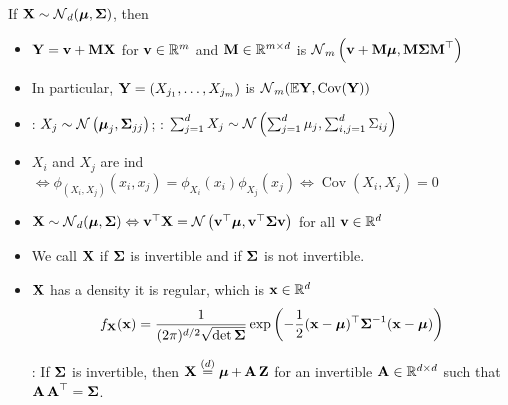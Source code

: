 If $\vect{X} \sim \N_{d}(\vect{\mu}, \vect{\Sigma})$, then
\begin{itemize}[leftmargin=*]
    \item $\vect{Y}=\vect{v}+\vect{MX}$ for $\vect{v} \in \mathbb{R}^{m}$ and $\vect{M} \in \mathbb{R}^{m \times d}$ is $\N_{m}\left(\vect{v}+\vect{M \mu}, \vect{M} \vect{\Sigma} \vect{M}^{\top}\right)$
    \item In particular, $\vect{Y}=\left(X_{j_{1}}, \ldots, X_{j_{m}}\right)$ is $\N_{m}(\mathbb{E} \vect{Y}, \operatorname{Cov}(\vect{Y}))$
    \item {}: $X_{j} \sim \N\left(\vect{\mu}_{j}, \vect{\Sigma}_{j j}\right)$;
: $\sum_{j=1}^{d} X_{j} \sim \N\left(\sum_{j=1}^{d} \mu_{j}, \sum_{i, j=1}^{d} \Sigma_{i j}\right)$
    \item $X_{i}$ and $X_{j}$ are ind $\Leftrightarrow \phi_{\left(X_{i}, X_{j}\right)}\left(x_{i}, x_{j}\right)=\phi_{X_{i}}\left(x_{i}\right) \phi_{X_{j}}\left(x_{j}\right) \Leftrightarrow \operatorname{Cov}\left(X_{i}, X_{j}\right)=0$
    \item $\vect{X} \sim \N_{d}(\vect{\mu}, \vect{\Sigma}) \Leftrightarrow \vect{v}^{\top} \vect{X}=\N\left(\vect{v}^{\T} \vect{\mu}, \vect{v}^{\T} \vect{\Sigma v}\right)$ for all $\vect{v} \in \mathbb{R}^{d}$
    \item We call $\vect{X}$  if $\vect{\Sigma}$ is invertible and  if $\vect{\Sigma}$ is not invertible.
    \item $\vect{X}$ has a density  it is regular, which is $\x \in \mathbb{R}^{d}$
$$
f_{\vect{X}}(\vect{x})=\frac{1}{(2 \pi)^{d / 2} \sqrt{\operatorname{det} \vect{\Sigma}}} \exp \left(-\frac{1}{2}(\vect{x}-\vect{\mu})^{\T} \vect{\Sigma}^{-1}(\vect{x}-\vect{\mu})\right)
$$

    : If $\mSigma$ is invertible, then $\X \stackrel{(d)}{=} \mmu+\A \Z$ for an invertible $\A \in \mathbb{R}^{d \times d}$ such that $\A \A^{\T}=\mSigma$.
    

\end{itemize}
